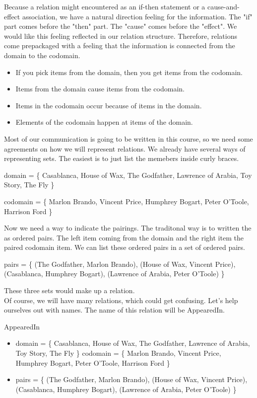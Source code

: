 \documentclass{ximera}
\begin{document}
Because a relation might encountered as an if-then statement or a cause-and-effect association, we have a natural direction feeling for the information.  The "if" part comes before the "then" part.  The "cause" comes before the "effect".  We would like this feeling reflected in our relation structure.  Therefore, relations come prepackaged with a feeling that the information is connected from the domain to the codomain.

\begin{itemize}
\item If you pick items from the domain, then you get items from the codomain.
\item Items from the domain cause items from the codomain.
\item Items in the codomain occur because of items in the domain.
\item Elements of the codomain happen at items of the domain.
\end{itemize}

Most of our communication is going to be written in this course, so we need some agreements on how we will represent relations.  We already have several ways of representing sets.  The easiest is to just list the memebers inside curly braces.

\begin{center} 
domain = \{ Casablanca, House of Wax,  The Godfather, Lawrence of Arabia, Toy Story, The Fly \} 
\end{center}

\begin{center} 
codomain = \{ Marlon Brando, Vincent Price, Humphrey Bogart, Peter O'Toole, Harrison Ford \} 
\end{center}

Now we need a way to indicate the pairings.  The traditonal way is to written the as ordered pairs.  The left item coming from the domain and the right item the paired codomain item.  We can list these ordered pairs in a set of ordered pairs.

\begin{center} 
pairs = \{ (The Godfather, Marlon Brando), (House of Wax, Vincent Price), (Casablanca, Humphrey Bogart), (Lawrence of Arabia, Peter O'Toole) \} 
\end{center}


These three sets would make up a relation. \\

Of course, we will have many relations, which could get confusing.  Let's help ourselves out with names.  The name of this relation will be AppearedIn.


\begin{example} AppearedIn
\begin{itemize}
\item domain = \{ Casablanca, House of Wax,  The Godfather, Lawrence of Arabia, Toy Story, The Fly \}  
\tem codomain = \{ Marlon Brando, Vincent Price, Humphrey Bogart, Peter O'Toole, Harrison Ford \} 
\item pairs = \{ (The Godfather, Marlon Brando), (House of Wax, Vincent Price), (Casablanca, Humphrey Bogart), (Lawrence of Arabia, Peter O'Toole) \} 
\end{itemize}
\end{example}
\end{document}
